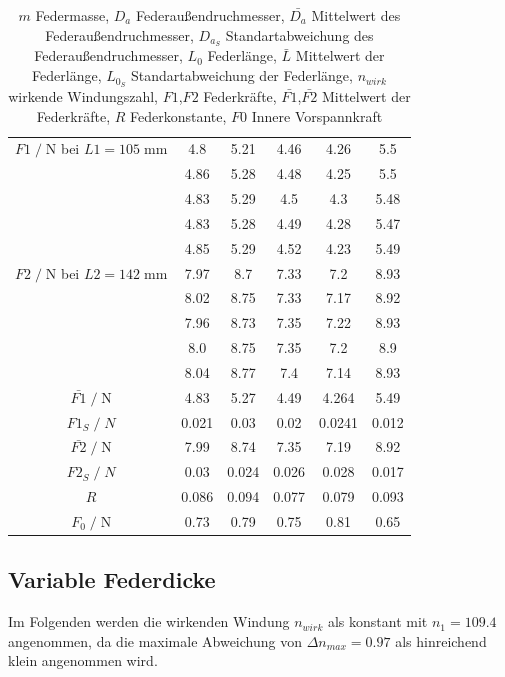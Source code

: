 \begin{table}[H]
\begin{tabular}{c | c c c c c}
        \midrule
        $F1\;/\;$N bei $L1=105\;$mm & 4.8 & 5.21 & 4.46 & 4.26 & 5.5\\
                         & 4.86 & 5.28 & 4.48 & 4.25 & 5.5\\
                         & 4.83 & 5.29 & 4.5 & 4.3 & 5.48\\
                         & 4.83 & 5.28 & 4.49 & 4.28 & 5.47\\
                         & 4.85 & 5.29 & 4.52 & 4.23 & 5.49\\
        \midrule
        $F2\;/\;$N bei $L2=142\;$mm & 7.97 & 8.7 & 7.33 & 7.2 & 8.93\\
                         & 8.02 & 8.75 & 7.33 & 7.17 & 8.92\\
                         & 7.96 & 8.73 & 7.35 & 7.22 & 8.93\\
                         & 8.0 & 8.75 & 7.35 & 7.2 & 8.9\\
                         & 8.04 & 8.77 & 7.4 & 7.14 & 8.93\\
        \midrule
        $\bar{F1}\;/\;$N & 4.83 & 5.27 & 4.49 & 4.264 & 5.49\\
        $F1_S\;/\;N$     & 0.021& 0.03 & 0.02 & 0.0241& 0.012\\ 
        $\bar{F2}\;/\;$N & 7.99 & 8.74 & 7.35 & 7.19 & 8.92\\
        $F2_S\;/\;N$     & 0.03 &0.024 & 0.026& 0.028& 0.017\\ 
        \midrule
        $R$ & 0.086 & 0.094 & 0.077 & 0.079 & 0.093\\
        \midrule
        $F_0\;/\;$N & 0.73 & 0.79 & 0.75 & 0.81 & 0.65\\ 
        \bottomrule
    \end{tabular}
    \caption{$m$ Federmasse,
             $D_a$ Federaußendruchmesser, 
             $\bar{D_a}$ Mittelwert des Federaußendruchmesser, 
             $D_{a_S}$ Standartabweichung des Federaußendruchmesser,
             $L_0$ Federlänge,
             $\bar{L}$ Mittelwert der Federlänge,
             $L_{0_S}$ Standartabweichung der Federlänge,
             $n_{wirk}$ wirkende Windungszahl,
             $F1$,$F2$ Federkräfte,
             $\bar{F1}$,$\bar{F2}$ Mittelwert der Federkräfte,
             $R$ Federkonstante,
             $F0$ Innere Vorspannkraft
    }
    \label{tab:Wertetabelle}
\end{table}


\subsection{Variable Federdicke}
Im Folgenden werden die wirkenden Windung $n_{wirk}$ als konstant mit $n_1=109.4$ angenommen, 
da die maximale Abweichung von $\Delta n_{max}=0.97$ als hinreichend klein angenommen wird.


